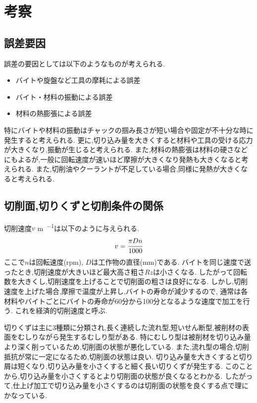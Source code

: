 \section{考察}
\subsection{誤差要因}
誤差の要因としては以下のようなものが考えられる.
\begin{itemize}
  \item バイトや旋盤など工具の摩耗による誤差
  \item バイト・材料の振動による誤差
  \item 材料の熱膨張による誤差
\end{itemize}
特にバイトや材料の振動はチャックの掴み長さが短い場合や固定が不十分な時に発生すると考えられる.
更に,切り込み量を大きくすると材料や工具の受ける応力が大きくなり,振動が生じると考えられる.
また,材料の熱膨張は材料の硬さなどにもよるが,一般に回転速度が速いほど摩擦が大きくなり発熱も大きくなると考えられる.
また,切削油やクーラントが不足している場合,同様に発熱が大きくなると考えられる.
\subsection{切削面,切りくずと切削条件の関係}
切削速度$v$ \si{\metre.\min^{-1}}は以下のように与えられる.\cite{unti}
\begin{align*}
  v=\cfrac{\pi Dn}{1000}
\end{align*}
ここで$n$は回転速度(rpm), $D$は工作物の直径(mm)である.
バイトを同じ速度で送ったとき,切削速度が大きいほど最大高さ粗さ$Rz$は小さくなる.
したがって回転数を大きくし,切削速度を上げることで切削面の粗さは良好になる.
しかし,切削速度を上げた場合,摩擦で温度が上昇し,バイトの寿命が減少するので,
通常は各材料やバイトごとにバイトの寿命が60分から100分となるような速度で加工を行う.
これを経済的切削速度と呼ぶ.\cite{unti}

切りくずは主に3種類に分類され,長く連続した流れ型,短いせん断型,被削材の表面をむしりながら発生するむしり型がある.\cite{197674}
特にむしり型は被削材を切り込み量より深く削っているため,切削面の状態が悪化している.
また,流れ型の場合,切削抵抗が常に一定になるため,切削面の状態は良い.
切り込み量を大きくすると切り屑は短くなり,切り込み量を小さくすると細く長い切りくずが発生する.\cite{osikko}
このことから,切り込み量を小さくするとより切削面の状態が良くなるとわかる.
したがって,仕上げ加工で切り込み量を小さくするのは切削面の状態を良くする点で理にかなっている.
